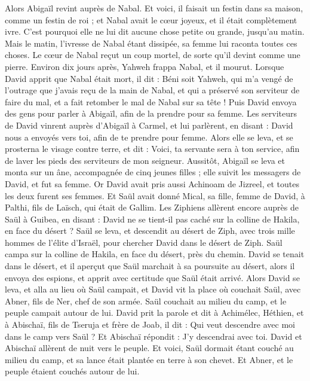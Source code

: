 \begin{multicols}{2}
Alors Abigaïl revint auprès de Nabal. Et voici, il faisait un festin dans sa maison, comme un festin de roi ; et Nabal avait le cœur joyeux, et il était complètement ivre. C'est pourquoi elle ne lui dit aucune chose petite ou grande, jusqu'au matin.
Mais le matin, l'ivresse de Nabal étant dissipée, sa femme lui raconta toutes ces choses. Le cœur de Nabal reçut un coup mortel, de sorte qu'il devint comme une pierre.
Environ dix jours après, Yahweh frappa Nabal, et il mourut.
Lorsque David apprit que Nabal était mort, il dit : Béni soit Yahweh, qui m'a vengé de l'outrage que j'avais reçu de la main de Nabal, et qui a préservé son serviteur de faire du mal, et a fait retomber le mal de Nabal sur sa tête ! Puis David envoya des gens pour parler à Abigaïl, afin de la prendre pour sa femme.
Les serviteurs de David vinrent auprès d'Abigaïl à Carmel, et lui parlèrent, en disant : David nous a envoyés vers toi, afin de te prendre pour femme.
Alors elle se leva, et se prosterna le visage contre terre, et dit : Voici, ta servante sera à ton service, afin de laver les pieds des serviteurs de mon seigneur.
Aussitôt, Abigaïl se leva et monta sur un âne, accompagnée de cinq jeunes filles ; elle suivit les messagers de David, et fut sa femme.
Or David avait pris aussi Achinoam de Jizreel, et toutes les deux furent ses femmes.
Et Saül avait donné Mical, sa fille, femme de David, à Palthi, fils de Laïsch, qui était de Gallim.
\VerseOne{}Les Ziphiens allèrent encore auprès de Saül à Guibea, en disant : David ne se tient-il pas caché sur la colline de Hakila, en face du désert ?
Saül se leva, et descendit au désert de Ziph, avec trois mille hommes de l'élite d'Israël, pour chercher David dans le désert de Ziph.
Saül campa sur la colline de Hakila, en face du désert, près du chemin. David se tenait dans le désert, et il aperçut que Saül marchait à sa poursuite au désert,
alors il envoya des espions, et apprit avec certitude que Saül était arrivé.
Alors David se leva, et alla au lieu où Saül campait, et David vit la place où couchait Saül, avec Abner, fils de Ner, chef de son armée. Saül couchait au milieu du camp, et le peuple campait autour de lui.
David prit la parole et dit à Achimélec, Héthien, et à Abischaï, fils de Tseruja et frère de Joab, il dit : Qui veut descendre avec moi dans le camp vers Saül ? Et Abischaï répondit : J'y descendrai avec toi.
David et Abischaï allèrent de nuit vers le peuple. Et voici, Saül dormait étant couché au milieu du camp, et sa lance était plantée en terre à son chevet. Et Abner, et le peuple étaient couchés autour de lui.

\end{multicols}
